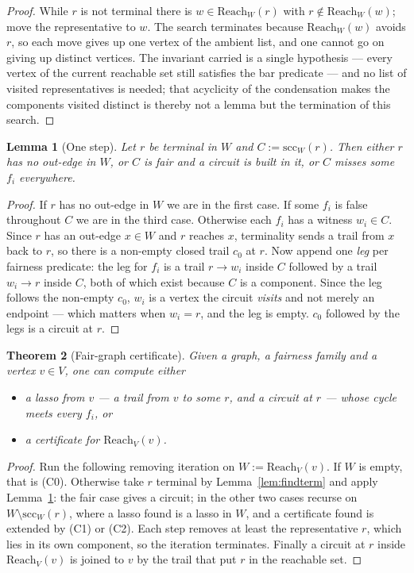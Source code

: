 \documentclass[11pt,a4paper]{article}
\newtheorem{theorem}{Theorem}[section]
\newtheorem{lemma}[theorem]{Lemma}
\theoremstyle{definition}
\newcommand{\Reach}{\mathrm{Reach}}
\begin{document}
\begin{proof}
While $r$ is not terminal there is $w\in\Reach_W(r)$ with $r\notin\Reach_W(w)$;
move the representative to $w$.  The search terminates because
$\Reach_W(w)$ avoids $r$, so each move gives up one vertex of the ambient list,
and one cannot go on giving up distinct vertices.  The invariant carried is a
single hypothesis --- every vertex of the current reachable set still satisfies
the bar predicate --- and no list of visited representatives is needed; that
acyclicity of the condensation makes the components visited distinct is thereby
not a lemma but the termination of this search.
\end{proof}

\begin{lemma}[One step]\label{lem:block}
Let $r$ be terminal in $W$ and $C:=\mathrm{scc}_W(r)$.  Then either $r$ has no
out-edge in $W$, or $C$ is fair and a circuit is built in it, or $C$ misses
some $f_i$ everywhere.
\end{lemma}

\begin{proof}
If $r$ has no out-edge in $W$ we are in the first case.  If some $f_i$ is false
throughout $C$ we are in the third case.  Otherwise each
$f_i$ has a witness $w_i\in C$.  Since $r$ has an out-edge $x\in W$ and $r$
reaches $x$, terminality sends a trail from $x$ back to $r$, so there is a
non-empty closed trail $c_0$ at $r$.  Now append one \emph{leg} per fairness
predicate: the leg for $f_i$ is a trail $r\to w_i$ inside $C$ followed by a
trail $w_i\to r$ inside $C$, both of which exist because $C$ is a component.
Since the leg follows the non-empty $c_0$, $w_i$ is a vertex the circuit
\emph{visits} and not merely an endpoint --- which matters when $w_i=r$, and the
leg is empty.  $c_0$ followed by the legs is a circuit at $r$.
\end{proof}

\begin{theorem}[Fair-graph certificate]\label{thm:fairgraph}
Given a graph, a fairness family and a vertex $v\in V$, one can compute either
\begin{itemize}
\item[(a)] a lasso from $v$ --- a trail from $v$ to some $r$, and a circuit at
  $r$ --- whose cycle meets every $f_i$, or
\item[(b)] a certificate for $\Reach_V(v)$.
\end{itemize}
\end{theorem}

\begin{proof}
Run the following removing iteration on $W:=\Reach_V(v)$.  If $W$ is empty,
that is (C0).  Otherwise take $r$ terminal by Lemma~\ref{lem:findterm} and
apply Lemma~\ref{lem:block}: the fair case gives a circuit; in the other two
cases recurse on $W\setminus\mathrm{scc}_W(r)$, where a lasso found is a lasso
in $W$, and a certificate found is extended by (C1) or (C2).  Each step removes
at least the representative $r$, which lies in its own component, so the
iteration terminates.  Finally a circuit at $r$ inside $\Reach_V(v)$
is joined to $v$ by the trail that put $r$ in the reachable set.
\end{proof}
\end{document}
